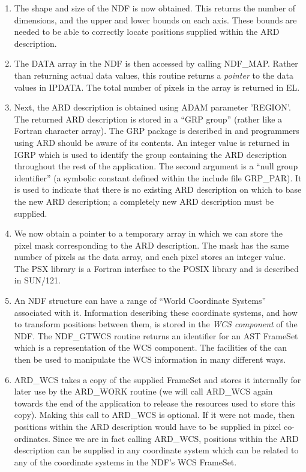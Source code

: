\begin{enumerate}
\item The shape and size of the NDF is now obtained. This returns the number of
dimensions, and the upper and lower bounds on each axis. These bounds are needed
to be able to correctly locate positions supplied within the ARD description. 

\item The DATA array in the NDF is then accessed by calling NDF\_MAP. Rather 
than returning actual data values, this routine returns a {\em pointer} to the 
data values in IPDATA. The total number of pixels in the array is returned in 
EL.

\item Next, the ARD description is obtained using ADAM parameter 'REGION'. The
returned ARD description is stored in a ``GRP group'' (rather like a Fortran
character array). The GRP package is described in  and programmers using
ARD should be aware of its contents. An integer value is returned in IGRP
which is used to identify the group containing the ARD description throughout
the rest of the application. The second argument is a ``null group identifier''
(a symbolic constant defined within the include file GRP\_PAR). It is used to
indicate that there is no existing ARD description on which to base the new ARD
description; a completely new ARD description must be supplied. 

\item We now obtain a pointer to a temporary array in which we can store the
pixel mask corresponding to the ARD description. The mask has the same number of
pixels as the data array, and each pixel stores an integer value. The PSX 
library is a Fortran interface to the POSIX library and is described in SUN/121.

\item An NDF structure can have a range of ``World Coordinate Systems''
associated with it. Information describing these coordinate systems, and
how to transform positions between them, is stored in the {\em WCS
component} of the NDF. The NDF\_GTWCS routine returns an identifier for an 
AST FrameSet which is a representation of the WCS component. The facilities 
of the  can then be used to manipulate the WCS 
information in many different ways.

\item ARD\_WCS takes a copy of the supplied FrameSet and stores it
internally for later use by the ARD\_WORK routine (we will call
ARD\_WCS again towards the end of the application to release the 
resources used to store this copy). Making this call to ARD\_WCS is
optional. If it were not made, then positions within the ARD description  
would have to be supplied in pixel co-ordinates. Since we are in fact
calling ARD\_WCS, positions within the ARD description can be supplied in
any coordinate system which can be related to any of the coordinate
systems in the NDF's WCS FrameSet.


\end{enumerate}

